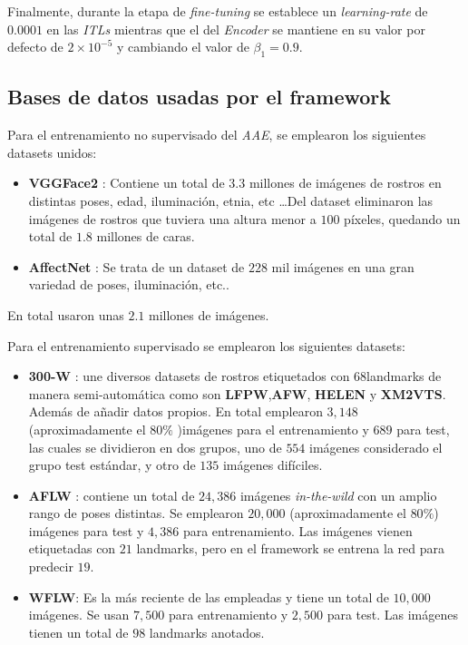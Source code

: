                 \medskip

                \noindent Finalmente, durante la etapa de \textit{fine-tuning} se establece un \textit{learning-rate} de $0.0001$ en las \textit{ITLs} mientras que el del \textit{Encoder} se mantiene en su valor por defecto de $2 \times 10^{-5}$ y cambiando el valor de $\beta_1 = 0.9$.

        \subsection{Bases de datos usadas por el framework}
            
            \noindent Para el entrenamiento no supervisado del \textit{AAE}, se emplearon los siguientes datasets unidos: 

            \begin{itemize}
                \item \textbf{VGGFace2} : Contiene un total de $3.3$ millones de imágenes de rostros en distintas poses, edad, iluminación, etnia, etc \ldots  Del dataset eliminaron las imágenes de rostros que tuviera una altura menor a $100$ píxeles, quedando un total de $1.8$ millones de caras.
                \item \textbf{AffectNet} : Se trata de un dataset de $228$ mil imágenes en una gran variedad de poses, iluminación, etc..
            \end{itemize}

            \noindent En total usaron unas $2.1$ millones de imágenes.

            \noindent Para el entrenamiento supervisado se emplearon los siguientes datasets: 

            \begin{itemize}
                \item \textbf{300-W} : une diversos datasets de rostros etiquetados con \textbf{$68$}landmarks de manera semi-automática como son \textbf{LFPW},\textbf{AFW}, \textbf{HELEN} y \textbf{XM2VTS}. Además de añadir datos propios. En total emplearon $3,148$ (aproximadamente el $80 \%$ )imágenes para el entrenamiento y $689$ para test, las cuales se dividieron en dos grupos, uno de $554$ imágenes considerado el grupo test estándar, y otro de $135$ imágenes difíciles.
                \item \textbf{AFLW} : contiene un total de $24,386$ imágenes \textit{in-the-wild} con un amplio rango de poses distintas. Se emplearon $20,000$ (aproximadamente el $80 \%$) imágenes para test y $4,386$ para entrenamiento. Las imágenes vienen etiquetadas con $21$ landmarks, pero en el framework se entrena la red para predecir \textbf{$19$}.
                \item \textbf{WFLW}: Es la más reciente de las empleadas y tiene un total de $10,000$ imágenes. Se usan $7,500$ para entrenamiento y $2,500$ para test. Las imágenes tienen un total de \textbf{$98$} landmarks anotados.
            \end{itemize}

